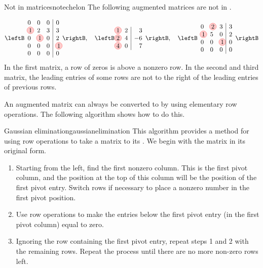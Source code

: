 \begin{example}{Not in {\ef}}{matricesnotechelon}
The following augmented matrices are not in {\ef}. 

\begin{equation*}
\leftB
\begin{array}{rrr|r}
0 & 0 & 0 & 0 \\
\circled{1} & 2 & 3 & 3 \\
0 & \circled{1} & 0 & 2 \\
0 & 0 & 0 & \circled{1} \\
0 & 0 & 0 & 0
\end{array}
\rightB, \quad \leftB
\begin{array}{rr|r}
\circled{1} & 2 & 3 \\
\circled{2} & 4 & -6 \\
\circled{4} & 0 & 7
\end{array}
\rightB, \quad \leftB
\begin{array}{rrr|r}
0 & \circled{2} & 3 & 3 \\
\circled{1} & 5 & 0 & 2 \\
0 & 0 & \circled{1} & 0 \\
0 & 0 & 0 & 0
\end{array}
\rightB 
\end{equation*}
In the first matrix, a row of zeros is above a nonzero row. In the
second and third matrix, the leading entries of some rows are not to
the right of the leading entries of previous rows.
\end{example}

An augmented matrix can always be converted to {\ef} by using
elementary row operations. The following algorithm shows how to do
this.

\begin{algorithm}{Gaussian elimination}{gaussianelimination}
  This algorithm provides a method for using row operations to take a
  matrix to its {\ef} .
  We begin with the matrix in its original form.

  \begin{enumerate}
  \item Starting from the left, find the first nonzero column. This is
    the first pivot column, and the position at the top of this column
    will be the position of the first pivot entry. Switch rows if
    necessary to place a nonzero number in the first pivot position.

  \item Use row operations to make the entries below the first pivot
    entry (in the first pivot column) equal to zero.

  \item Ignoring the row containing the first pivot entry, repeat
    steps 1 and 2 with the remaining rows.  Repeat the process until
    there are no more non-zero rows left.

  \end{enumerate}
\end{algorithm}

